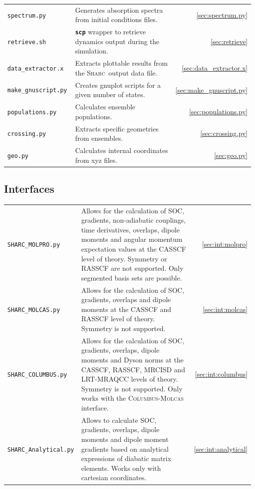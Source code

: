 \documentclass[a4paper,11pt,DIV=15,openany,twoside=false]{scrbook}
\newcommand{\sharc}{\textsc{Sharc}}
\newcommand{\ttt}[1]{\textbf{\texttt{#1}}}
\begin{document}
\begin{tabular}{>{\tt}lp{9.5cm}r}
  spectrum.py           &Generates absorption spectra from initial conditions files.            &\ref{sec:spectrum.py}\\
  retrieve.sh           &\ttt{scp} wrapper to retrieve dynamics output during the simulation.   &\ref{sec:retrieve}\\
  data\_extractor.x     &Extracts plottable results from the \sharc\ output data file.          &\ref{sec:data_extractor.x}\\
  make\_gnuscript.py    &Creates gnuplot scripts for a given number of states.                  &\ref{sec:make_gnuscript.py}\\
  populations.py        &Calculates ensemble populations.                                       &\ref{sec:populations.py}\\
  crossing.py           &Extracts specific geometries from ensembles.                                          &\ref{sec:crossing.py}\\
  geo.py                &Calculates internal coordinates from xyz files.              &\ref{sec:geo.py}\\
\end{tabular}

\subsection{Interfaces}

\begin{tabular}{>{\tt}lp{9.5cm}r}
  SHARC\_MOLPRO.py      &Allows for the calculation of SOC, gradients, non-adiabatic couplings, time derivatives, overlaps, dipole moments and angular momentum expectation values at the CASSCF level of theory. Symmetry or RASSCF are not supported. Only segmented basis sets are possible.   &\ref{sec:int:molpro}\\
  SHARC\_MOLCAS.py      &Allows for the calculation of SOC, gradients, overlaps and dipole moments at the CASSCF and RASSCF level of theory. Symmetry is not supported.   &\ref{sec:int:molcas}\\
  SHARC\_COLUMBUS.py    &Allows for the calculation of SOC, gradients, overlaps, dipole moments and Dyson norms at the CASSCF, RASSCF, MRCISD and LRT-MRAQCC levels of theory. Symmetry is not supported. Only works with the \textsc{Columbus}-\textsc{Molcas} interface.                  &\ref{sec:int:columbus}\\
  SHARC\_Analytical.py  &Allows to calculate SOC, gradients, overlaps, dipole moments and dipole moment gradients based on analytical expressions of diabatic matrix elements. Works only with cartesian coordinates.       &\ref{sec:int:analytical}\\
\end{tabular}
\end{document}
